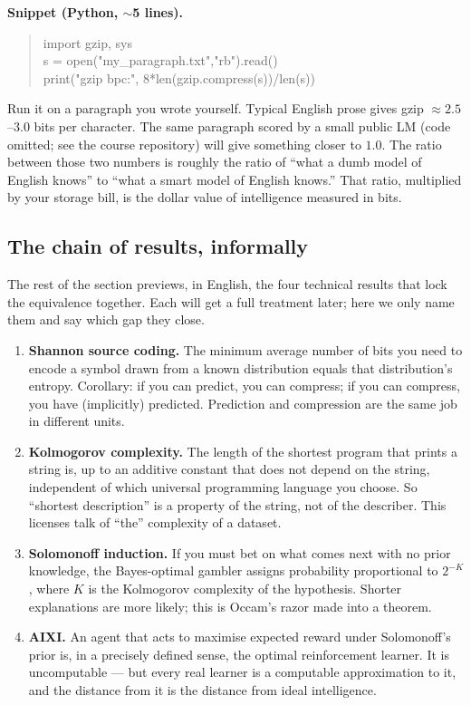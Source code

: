 \begin{activity}[title={Activity A2 --- Compress your own paragraph}]
\textbf{Snippet (Python, $\sim$5 lines).}
\begin{quote}\small\ttfamily
import gzip, sys\\
s = open("my\_paragraph.txt","rb").read()\\
print("gzip bpc:", 8*len(gzip.compress(s))/len(s))
\end{quote}
Run it on a paragraph you wrote yourself. Typical English prose
gives gzip $\approx 2.5$--$3.0$ bits per character. The same
paragraph scored by a small public LM (code omitted; see the course
repository) will give something closer to $1.0$. The ratio between
those two numbers is roughly the ratio of ``what a dumb model of
English knows'' to ``what a smart model of English knows.'' That
ratio, multiplied by your storage bill, is the dollar value of
intelligence measured in bits.
\end{activity}

\subsection*{The chain of results, informally}

The rest of the section previews, in English, the four technical
results that lock the equivalence together. Each will get a full
treatment later; here we only name them and say which gap they
close.

\begin{enumerate}[leftmargin=1.4em]
  \item \textbf{Shannon source coding.} The minimum average number
  of bits you need to encode a symbol drawn from a known
  distribution equals that distribution's entropy. Corollary: if
  you can predict, you can compress; if you can compress, you have
  (implicitly) predicted. Prediction and compression are the same
  job in different units.
  \item \textbf{Kolmogorov complexity.} The length of the shortest
  program that prints a string is, up to an additive constant that
  does not depend on the string, independent of which universal
  programming language you choose. So ``shortest description'' is
  a property of the string, not of the describer. This licenses
  talk of ``the'' complexity of a dataset.
  \item \textbf{Solomonoff induction.} If you must bet on what
  comes next with no prior knowledge, the Bayes-optimal gambler
  assigns probability proportional to $2^{-K}$, where $K$ is the
  Kolmogorov complexity of the hypothesis. Shorter explanations
  are more likely; this is Occam's razor made into a theorem.
  \item \textbf{AIXI.} An agent that acts to maximise expected
  reward under Solomonoff's prior is, in a precisely defined
  sense, the optimal reinforcement learner. It is uncomputable ---
  but every real learner is a computable approximation to it, and
  the distance from it is the distance from ideal intelligence.
\end{enumerate}

